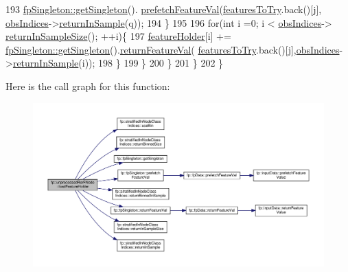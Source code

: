 \begin{DoxyCode}
193                                     \hyperlink{classfp_1_1fpSingleton_a8bdae77b68521003e3fc630edec2e240}{fpSingleton::getSingleton}().
      \hyperlink{classfp_1_1fpSingleton_ab789c4e4bfb3248711a5857015008f8d}{prefetchFeatureVal}(\hyperlink{classfp_1_1unprocessedRerFNode_aa2028578f341c8f41cf000eb40d228f2}{featuresToTry}.back()[j],
      \hyperlink{classfp_1_1unprocessedRerFNode_ad52d9d508bf378bc793b8cf961163735}{obsIndices}->\hyperlink{classfp_1_1stratifiedInNodeClassIndices_a2d7e802fb97db0367bb8e8f31d393afd}{returnInSample}(q));
194                                 \}
195 
196                                 \textcolor{keywordflow}{for}(\textcolor{keywordtype}{int} i =0; i < \hyperlink{classfp_1_1unprocessedRerFNode_ad52d9d508bf378bc793b8cf961163735}{obsIndices}->
      \hyperlink{classfp_1_1stratifiedInNodeClassIndices_a596235ffec7250fabd2818d395b39c66}{returnInSampleSize}(); ++i)\{
197                                     \hyperlink{classfp_1_1unprocessedRerFNode_a09fa17210a5916239cba6716c636cc4e}{featureHolder}[i] += 
      \hyperlink{classfp_1_1fpSingleton_a8bdae77b68521003e3fc630edec2e240}{fpSingleton::getSingleton}().\hyperlink{classfp_1_1fpSingleton_aacc2eb894a219e2fe234743b51fa1a76}{returnFeatureVal}(
      \hyperlink{classfp_1_1unprocessedRerFNode_aa2028578f341c8f41cf000eb40d228f2}{featuresToTry}.back()[j],\hyperlink{classfp_1_1unprocessedRerFNode_ad52d9d508bf378bc793b8cf961163735}{obsIndices}->\hyperlink{classfp_1_1stratifiedInNodeClassIndices_a2d7e802fb97db0367bb8e8f31d393afd}{returnInSample}(i));
198                                 \}
199                             \}
200                         \}
201                     \}
202                 \}
\end{DoxyCode}
Here is the call graph for this function\+:
\nopagebreak
\begin{figure}[H]
\begin{center}
\leavevmode
\includegraphics[width=350pt]{classfp_1_1unprocessedRerFNode_a6510faa628fda49d672dcd1b88a3834b_cgraph}
\end{center}
\end{figure}
\mbox{\label{classfp_1_1unprocessedRerFNode_aee896249351b674045d1cecd653cb446}} 
